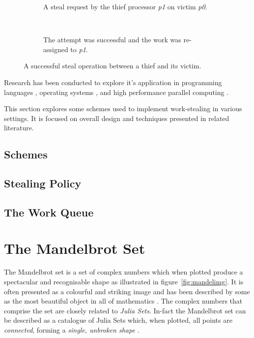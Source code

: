 \begin{figure}[h]
\centering
\begin{subfigure}[b]{0.4\textwidth}
  \centering    
  
  \caption{
    \tiny A steal request by the thief processor \textit{p1} on victim \textit{p0}.
  }
  \label{fig:stealreq}
\end{subfigure}
~~~~~~ %
\begin{subfigure}[b]{0.4\textwidth}
  \centering
  
  \caption{
    \tiny The attempt was successful and the work was re-assigned to \textit{p1}.
  }
  \label{fig:stealsuccess}
\end{subfigure}
\caption{
    A successful steal operation between a thief and its victim.
  }
\label{fig:stealoperation}
\end{figure}

Research has been conducted to explore it's application in programming languages \cite{}, 
operating systems \cite{}, and high performance parallel computing \cite{}.

This section explores some schemes used to implement work-stealing in various settings. It is focused on overall design and 
techniques presented in related literature. 

\subsection*{Schemes}
\subsection*{Stealing Policy}
\subsection*{The Work Queue}


\section{The Mandelbrot Set}

The Mandelbrot set is a set of complex numbers which when plotted produce a spectacular and recognisable shape as illustrated in figure~\ref{fig:mandelimg}.
It is often presented as a colourful and striking image and has been described by some as the most beautiful object in all of mathematics \cite[p.~234]{chaosfract}.
The complex numbers that comprise the set are closely related to \textit{Julia Sets}. 
In-fact the Mandelbrot set can be described as a catalogue of Julia Sets which, when plotted, all points are \textit{connected}, 
forming a \textit{single, unbroken shape} \cite[p.~177]{fractimg}.

